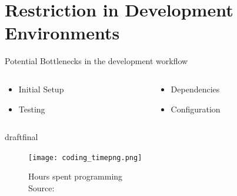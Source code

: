 \documentclass{beamer}
\def\final{final}
\def\status{draft}
\begin{document}
\section{Restriction in Development Environments}
\begin{frame}{}
  \begin{center}
    \large{\color{uos-red-full} Potential Bottlenecks in the development workflow}
    \normalsize
    \vspace{0.5cm}
    \begin{columns}[totalwidth=\textwidth]
      \begin{column}{0.4\textwidth}
        \begin{itemize}
          \item Initial Setup
          \item Testing
        \end{itemize}
      \end{column}
      \begin{column}{0.4\textwidth}
        \begin{itemize}
          \item Dependencies
          \item Configuration
        \end{itemize}
      \end{column}
    \end{columns}
  \end{center}

  \ifx\status\final{}
    \pause{}
  \fi

  \begin{figure}
    \texttt{[image: coding\_timepng.png]}
    \caption{\footnotesize Hours spent programming \\\textcolor{uos-grey-full}{Source: {\cite{setuppain}}}}
  \end{figure}
\end{frame}
\end{document}
